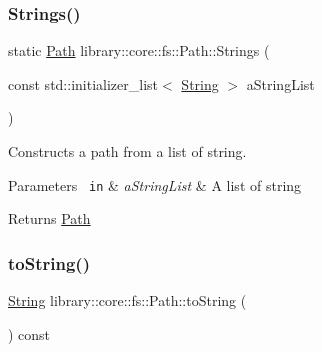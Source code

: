 \subsubsection{\texorpdfstring{Strings()}{Strings()}}
{\footnotesize\ttfamily static \mbox{\hyperlink{classlibrary_1_1core_1_1fs_1_1_path}{Path}} library\+::core\+::fs\+::\+Path\+::\+Strings (\begin{DoxyParamCaption}\item[{const std\+::initializer\+\_\+list$<$ \mbox{\hyperlink{classlibrary_1_1core_1_1types_1_1_string}{String}} $>$}]{a\+String\+List }\end{DoxyParamCaption})\hspace{0.3cm}{\ttfamily [static]}}



Constructs a path from a list of string. 


\begin{DoxyCode}{0}
\end{DoxyCode}



\begin{DoxyParams}[1]{Parameters}
\mbox{\texttt{ in}}  & {\em a\+String\+List} & A list of string \\
\hline
\end{DoxyParams}
\begin{DoxyReturn}{Returns}
\mbox{\hyperlink{classlibrary_1_1core_1_1fs_1_1_path}{Path}} 
\end{DoxyReturn}
\mbox{\label{classlibrary_1_1core_1_1fs_1_1_path_a6f78df53d8e604dd9e1b43e23311724a}} 
\subsubsection{\texorpdfstring{toString()}{toString()}}
{\footnotesize\ttfamily \mbox{\hyperlink{classlibrary_1_1core_1_1types_1_1_string}{String}} library\+::core\+::fs\+::\+Path\+::to\+String (\begin{DoxyParamCaption}{ }\end{DoxyParamCaption}) const}



